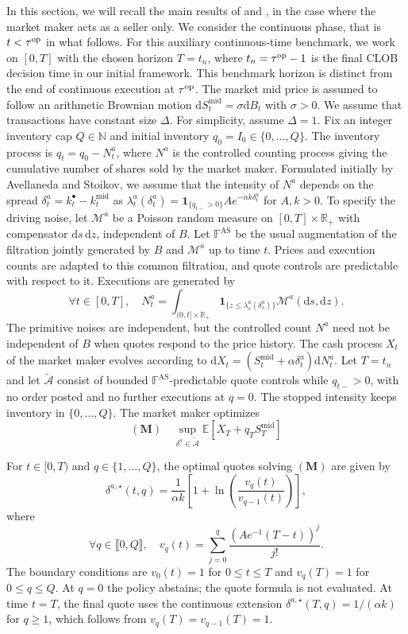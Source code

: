 \documentclass[11pt]{article}
\begin{document}
In this section, we will recall the main results of \cite{avellaneda2008high} and \cite{gueant2013dealing}, in the case where the market maker acts as a seller only. We consider the continuous phase, that is $t < \tau^{\mathrm{op}}$ in what follows. For this auxiliary continuous-time benchmark, we work on $[0,T]$ with the chosen horizon $T=t_n$, where $t_n={\tau^{\mathrm{op}}}-1$ is the final CLOB decision time in our initial framework. This benchmark horizon is distinct from the end of continuous execution at $\tau^{\mathrm{op}}$. The market mid price is assumed to follow an arithmetic Brownian motion $\mathrm{d}S_t^\mathrm{mid}=\sigma \mathrm{d}B_t$ with $\sigma>0$. We assume
that transactions have constant size $\Delta$. For simplicity, assume $\Delta = 1$. {Fix an integer inventory cap $Q\in\mathbb N$ and initial inventory $q_0=I_0\in\{0,\ldots,Q\}$. The inventory process is $q_t=q_0-N_t^a$,} where {$N^a$ is the controlled counting process giving the cumulative number of shares sold by the market maker}. Formulated initially by Avellaneda and Stoikov, we assume that the intensity of $N^a$ depends on the spread $\delta_t^a = k_t^\bullet - k_t^\mathrm{mid}$ as {$\lambda^a_t(\delta^a_t)=\mathbf1_{\{q_{t-}>0\}}Ae^{-\alpha k\delta_t^a}$} for $A,k > 0$.
{To specify the driving noise, let $\mathcal M^a$ be a Poisson random measure on $[0,T]\times\mathbb R_+$ with compensator $\mathrm ds\,\mathrm dz$, independent of $B$. Let $\mathbb F^{\mathrm{AS}}$ be the usual augmentation of the filtration jointly generated by $B$ and $\mathcal M^a$ up to time $t$. Prices and execution counts are adapted to this common filtration, and quote controls are predictable with respect to it. Executions are generated by
\[
\forall t \in [0,T],\quad N_t^a=\int_{(0,t]\times\mathbb R_+}
\mathbf1_{\{z\leqslant\lambda_s^a(\delta_s^a)\}}
\mathcal M^a(\mathrm ds,\mathrm dz).
\]
The primitive noises are independent, but the controlled count $N^a$ need not be independent of $B$ when quotes respond to the price history.}
The cash process $X_t$ of the market maker evolves according to $\mathrm{d}X_t = (S_t^\mathrm{mid}+\alpha\delta_t^a)\mathrm{d}N_t^a$. {Let $T=t_n$ and let $\tilde{\mathcal A}$ consist of bounded {$\mathbb F^{\mathrm{AS}}$-predictable} quote controls while $q_{t-}>0$, with no order posted and no further executions at $q=0$. The stopped intensity keeps inventory in $\{0,\ldots,Q\}$.} The market maker optimizes
\[(\mathbf{M})\quad \sup_{\delta^a \in \tilde{\mathcal A}} \mathbb{E}\left [X_T + q_{T}S_{T}^\mathrm{mid} \right]\]

\begin{proposition}

{For $t\in[0,T)$ and $q\in\{1,\ldots,Q\}$, the optimal quotes solving $(\mathbf M)$ are given by}
\[\delta^{a,\star}(t,q) = \frac{1}{\alpha k}\left [ 1+\ln \left ( \frac{v_q(t)}{v_{q-1}(t)}\right)\right],\] where 
\[\forall q \in \llbracket 0,Q \rrbracket, \quad v_q(t) = \sum_{j=0}^q \frac{(Ae^{-1}(T-t))^j}{j!}.\]
{The boundary conditions are $v_0(t)=1$ for $0\leq t\leq T$ and $v_q(T)=1$ for $0\leq q\leq Q$. At $q=0$ the policy abstains; the quote formula is not evaluated. At time $t=T$, the final quote uses the continuous extension $\delta^{a,\star}(T,q)=1/(\alpha k)$ for $q \ge 1$, which follows from $v_q(T)=v_{q-1}(T)=1$.}
\end{proposition}
\end{document}
